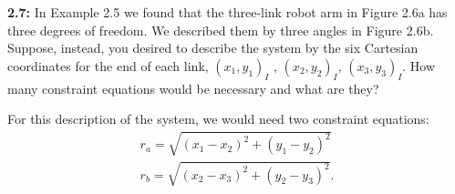 \begin{homeworkProblem}

	\textbf{2.7:} In Example 2.5 we found that the three-link robot arm in Figure 2.6a has three degrees of freedom. We described them by three angles in Figure 2.6b. Suppose, instead, you desired to describe the system by the six Cartesian coordinates for the end of each link, \( \left( x_{1}, y_{1} \right)_{I} \) , \( \left( x_{2}, y_{2} \right)_{I} \), \( \left( x_{3}, y_{3} \right)_{I} \). How many constraint equations would be necessary and what are they?

	\solution

	For this description of the system, we would need two constraint equations:
	\begin{align*}
		r_{a} = \sqrt{\left( x_{1} - x_{2} \right)^2 + \left( y_{1} - y_{2} \right)^2} \\
		r_{b} = \sqrt{\left( x_{2} - x_{3} \right)^2 + \left( y_{2} - y_{3} \right)^2}
		.\end{align*}

\end{homeworkProblem}

